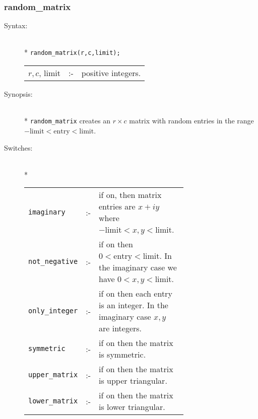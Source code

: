\subsubsection{random\_matrix}
\label{linalg:random_matrix}

\begin{description}
\item[Syntax:]\mbox{}\\*
\texttt{random\_matrix(r,c,limit);}\\[2mm]
\begin{tabular}{l l l} 
$r,c$, limit &:-& positive integers. \\
\end{tabular}

\item[Synopsis:]\mbox{}\\*
\texttt{random\_matrix} creates an $r\times c$ matrix with random entries in the
range $-\text{limit} < \text{entry} < \text{limit}$.

\hypertarget{switch:IMAGINARY}{}
\hypertarget{switch:NOT_NEGATIVE}{}
\hypertarget{switch:ONLY_INTEGER}{}
\hypertarget{switch:SYMMETRIC}{}
\hypertarget{switch:LOWER_MATRIX}{}
\hypertarget{switch:UPPER_MATRIX}{}
\item[Switches:]\mbox{}\\*
\begin{tabular}{l l p{0.685\linewidth}}
\texttt{imaginary}  &:-& if 
on, then matrix entries are $x+iy$ where $-\text{limit} < x,y < \text{limit}$.\\
\texttt{not\_negative} &:-& if on then $0 < 
\text{entry} < \text{limit}$. In the imaginary case we have $0<x,y<\text{limit}$.\\
\texttt{only\_integer} &:-& if on then each 
entry is an integer. In the imaginary case $x,y$ are integers.\\
\texttt{symmetric} &:-& if on then the matrix is symmetric. \\
\texttt{upper\_matrix} &:-& if on then the 
matrix is upper triangular. \\
\texttt{lower\_matrix} &:-& if on then the matrix is lower triangular.
\end{tabular}


\end{description}
